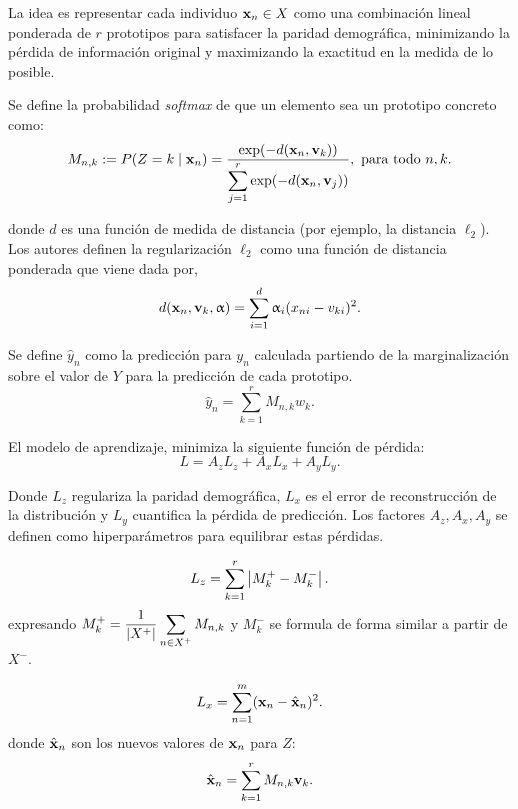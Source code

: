 \documentclass[oneside,openright,titlepage,numbers=noenddot,openany,headinclude,footinclude=true,
cleardoublepage=empty,abstractoff,BCOR=5mm,paper=a4,fontsize=12pt,main=spanish]{scrreprt}
\begin{document}
La idea es representar cada individuo $\textbf{x}_n \in X$ como una combinación lineal ponderada de $r$ prototipos para satisfacer la paridad demográfica, minimizando la pérdida de información original y maximizando la exactitud en la medida de lo posible.

Se define la probabilidad \textit{softmax} de que un elemento sea un prototipo concreto como:
\begin{equation*}
M_{n,k}:= P(Z=k \mid \nm{x}_n)=\ddfrac{\text{exp}(-d(\nm{x}_n,\nm{v}_k))}{\sum_{j=1}^r \text{exp}(-d(\nm{x}_n,\nm{v}_j))}, \ \text{para todo} \ n,k.
\end{equation*}

donde $d$ es una función de medida de distancia (por ejemplo, la distancia $\ell_2$). Los autores definen la regularización $\ell_2$ como una función de distancia ponderada que viene dada por,
\begin{equation*}
d(\textbf{x}_n,\textbf{v}_k,\upalpha)=\sum_{i=1}^d \upalpha_i (x_{ni}-v_{ki})^2.
\end{equation*}

Se define $\hat{y}_n$ como la predicción para $y_n$ calculada partiendo de la marginalización sobre el valor de $Y$ para la predicción de cada prototipo.
\begin{equation*}
\hat{y}_n=\sum_{k=1}^r M_{n,k} w_k.
\end{equation*}

El modelo de aprendizaje, minimiza la siguiente función de pérdida:
\begin{equation*}
L=A_zL_z+A_xL_x+A_yL_y.   
\end{equation*}

Donde $L_z$ regulariza la paridad demográfica, $L_x$ es el error de reconstrucción de la distribución y $L_y$ cuantifica la pérdida de predicción. Los factores $A_z, A_x, A_y$ se definen como hiperparámetros para equilibrar estas pérdidas.

\begin{equation*}
L_z=\sum_{k=1}^r \left\lvert M_k^+-M_k^-\right\rvert.
\end{equation*}
expresando $\displaystyle M_k^+=\frac{1}{\left\lvert X^+\right\rvert} \sum_{n\in X^+} M_{n,k}$ y $M_k^-$ se formula de forma similar a partir de $X^-$.

\begin{equation*}
L_x=\sum_{n=1}^m (\textbf{x}_n-\hat{\textbf{x}}_n)^2.
\end{equation*}
donde $\hat{\textbf{x}}_n$ son los nuevos valores de $\textbf{x}_n$ para $Z$:
\begin{equation*}
\hat{\textbf{x}}_n=\sum_{k=1}^r M_{n,k}\textbf{v}_k.
\end{equation*}
\end{document}
